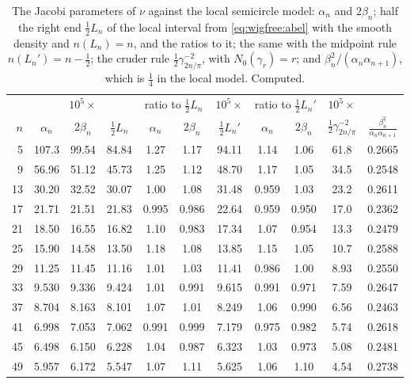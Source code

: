 \begin{table}[htbp]
\centering\footnotesize
\setlength{\tabcolsep}{2.6pt}
\begin{tabular}{rcccccccccc}
\toprule
 & \multicolumn{3}{c}{$10^5\times$} & \multicolumn{2}{c}{ratio to $\frac12L_n$} & $10^5\times$ & \multicolumn{2}{c}{ratio to $\frac12L_n'$} & $10^5\times$ & \\
\cmidrule(lr){2-4}\cmidrule(lr){5-6}\cmidrule(lr){7-7}\cmidrule(lr){8-9}\cmidrule(lr){10-10}
$n$ & $\alpha_n$ & $2\beta_n$ & $\frac12L_n$ & $\alpha_n$ & $2\beta_n$ & $\frac12L_n'$ & $\alpha_n$ & $2\beta_n$ & $\frac12\gamma_{2n/\pi}^{-2}$ & $\frac{\beta_n^2}{\alpha_n\alpha_{n+1}}$\\
\midrule
5 & 107.3 & 99.54 & 84.84 & 1.27 & 1.17 & 94.11 & 1.14 & 1.06 & 61.8 & 0.2665\\
9 & 56.96 & 51.12 & 45.73 & 1.25 & 1.12 & 48.70 & 1.17 & 1.05 & 34.5 & 0.2548\\
13 & 30.20 & 32.52 & 30.07 & 1.00 & 1.08 & 31.48 & 0.959 & 1.03 & 23.2 & 0.2611\\
17 & 21.71 & 21.51 & 21.83 & 0.995 & 0.986 & 22.64 & 0.959 & 0.950 & 17.0 & 0.2362\\
21 & 18.50 & 16.55 & 16.82 & 1.10 & 0.983 & 17.34 & 1.07 & 0.954 & 13.3 & 0.2479\\
25 & 15.90 & 14.58 & 13.50 & 1.18 & 1.08 & 13.85 & 1.15 & 1.05 & 10.7 & 0.2588\\
29 & 11.25 & 11.45 & 11.16 & 1.01 & 1.03 & 11.41 & 0.986 & 1.00 & 8.93 & 0.2550\\
33 & 9.530 & 9.336 & 9.424 & 1.01 & 0.991 & 9.615 & 0.991 & 0.971 & 7.59 & 0.2647\\
37 & 8.704 & 8.163 & 8.101 & 1.07 & 1.01 & 8.249 & 1.06 & 0.990 & 6.56 & 0.2463\\
41 & 6.998 & 7.053 & 7.062 & 0.991 & 0.999 & 7.179 & 0.975 & 0.982 & 5.74 & 0.2618\\
45 & 6.498 & 6.150 & 6.228 & 1.04 & 0.987 & 6.323 & 1.03 & 0.973 & 5.08 & 0.2481\\
49 & 5.957 & 6.172 & 5.547 & 1.07 & 1.11 & 5.625 & 1.06 & 1.10 & 4.54 & 0.2738\\
\bottomrule
\end{tabular}
\caption{The Jacobi parameters of $\nu$ against the local semicircle model: $\alpha_n$ and $2\beta_n$; half the right end $\frac12L_n$ of the local interval from \eqref{eq:wigfree:abel} with the smooth density and $n(L_n)=n$, and the ratios to it; the same with the midpoint rule $n(L_n')=n-\frac12$; the cruder rule $\frac12\gamma_{2n/\pi}^{-2}$, with $N_0(\gamma_r)=r$; and $\beta_n^2/(\alpha_n\alpha_{n+1})$, which is $\frac14$ in the local model. Computed.}
\label{tab:wigfree:jacobi}
\end{table}


